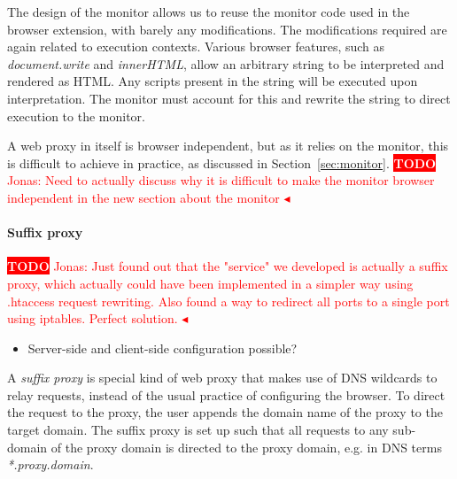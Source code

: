\documentclass{llncs}
\newcommand{\todo}[1]{\colorbox{red}{\textcolor{white}{\sffamily\bfseries\scriptsize TODO}} \textcolor{red}{#1} \textcolor{red}{$\blacktriangleleft$}}
\begin{document}
The design of the monitor allows us to reuse the monitor code used in the 
browser extension, with barely any modifications. The modifications required 
are again related to execution contexts. Various browser features, such as 
\emph{document.write} and \emph{innerHTML}, allow an arbitrary string to be 
interpreted and rendered as HTML. Any scripts present in the string will be 
executed upon interpretation. The monitor must account for this and rewrite 
the string to direct execution to the monitor.

A web proxy in itself is browser independent, but as it relies on the monitor, 
this is difficult to achieve in practice, as discussed in Section~\ref{sec:monitor}.
\todo{Jonas: Need to actually discuss why it is difficult to make the monitor browser independent in the new section about the monitor}


\paragraph{Suffix proxy}
\todo{Jonas: Just found out that the "service" we developed is actually a suffix proxy, which actually could have been implemented in a simpler way using .htaccess request rewriting. Also found a way to redirect all ports to a single port using iptables. Perfect solution.}
\begin{itemize}
\item Server-side and client-side configuration possible?
\end{itemize}


A \emph{suffix proxy} is special kind of web proxy that makes use of DNS wildcards to 
relay requests, instead of the usual practice of configuring the browser.
To direct the request to the proxy, the user appends the domain name of the 
proxy to the target domain. The suffix proxy is set up such
that all requests to any sub-domain of the proxy domain is directed to the proxy domain, 
e.g. in DNS terms \emph{*.proxy.domain}. 
\end{document}
